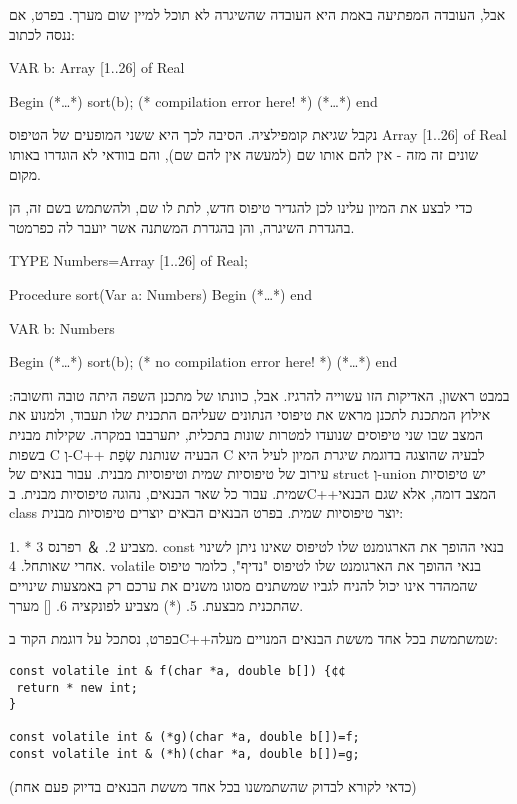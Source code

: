 \begin{טבלא}[!htbp]
      אבל, העובדה המפתיעה באמת היא העובדה שהשיגרה לא תוכל למיין שום מערך. בפרט, אם ננסה לכתוב:

      VAR
      b: Array [1..26] of Real

      Begin
      (*…*)
      sort(b); (* compilation error here! *)
      (*…*)
      end

      נקבל שגיאת קומפילציה. הסיבה לכך היא ששני המופעים של הטיפוס Array [1..26] of Real שונים זה מזה - אין להם אותו שם (למעשה אין להם שם), והם בוודאי לא הוגדרו באותו מקום.

      כדי לבצע את המיון עלינו לכן להגדיר טיפוס חדש, לתת לו שם, ולהשתמש בשם זה, הן בהגדרת השיגרה, והן בהגדרת המשתנה אשר יועבר לה כפרמטר.

      TYPE
      Numbers=Array [1..26] of Real;

      Procedure sort(Var a: Numbers)
      Begin
      (*…*)
      end

      VAR
      b: Numbers

      Begin
      (*…*)
      sort(b); (* no compilation error here! *)
      (*…*)
      end

      במבט ראשון, האדיקות הזו עשוייה להרגיז. אבל, כוונתו של מתכנן השפה היתה טובה וחשובה: אילוץ המתכנת לתכנן מראש את טיפוסי הנתונים שעליהם התכנית שלו תעבוד, ולמנוע את המצב שבו שני טיפוסים שנועדו למטרות שונות בתכלית, יתערבבו במקרה.
      שקילות מבנית בשפות C וְ-C++
      הבעיה שנותנת שְׂפַת C לבעיה שהוצגה בדוגמת שיגרת המיון לעיל היא עירוב של טיפוסיות שמית וטיפוסיות מבנית. עבור בנאים של struct וְ-union יש טיפוסיות שמית. עבור כל שאר הבנאים, נהוגה טיפוסיות מבנית. בC++המצב דומה, אלא שגם הבנאי class יוצר טיפוסיות שמית. בפרט הבנאים הבאים יוצרים טיפוסיות מבנית:

      1. * מצביע
      2. ＆ רפרנס
      3. const בנאי ההופך את הארגומנט שלו לטיפוס שאינו ניתן לשינוי אחרי שאותחל.
      4. volatile בנאי ההופך את הארגומנט שלו לטיפוס "נדיף", כלומר טיפוס שהמהדר אינו יכול להניח לגביו שמשתנים מסוגו משנים את ערכם רק באמצעות שינויים שהתכנית מבצעת.
      5. (*) מצביע לפונקציה
      6. [] מערך.

      בפרט, נסתכל על דוגמת הקוד בC++שמשתמשת בכל אחד מששת הבנאים המנויים מעלה:

\begin{verbatim}
const volatile int & f(char *a, double b[]) {¢¢
 return * new int;
}

const volatile int & (*g)(char *a, double b[])=f;
const volatile int & (*h)(char *a, double b[])=g;
\end{verbatim}

      (כדאי לקורא לבדוק שהשתמשנו בכל אחד מששת הבנאים בדיוק פעם אחת)


\end{טבלא}
